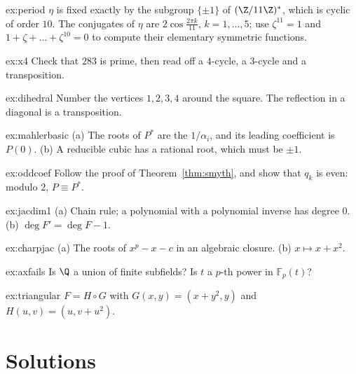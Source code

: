 \begin{hint}{ex:period}
$\eta$ is fixed exactly by the subgroup $\{\pm1\}$ of $(\Z/11\Z)^*$, which is cyclic of order $10$. The conjugates of $\eta$ are $2\cos\frac{2\pi k}{11}$,
$k=1,\dots,5$; use $\zeta^{11}=1$ and $1+\zeta+\dots+\zeta^{10}=0$ to compute their elementary symmetric functions.
\end{hint}
\begin{hint}{ex:x4}
Check that $283$ is prime, then read off a $4$-cycle, a $3$-cycle and a transposition.
\end{hint}
\begin{hint}{ex:dihedral}
Number the vertices $1,2,3,4$ around the square. The reflection in a diagonal is a transposition.
\end{hint}
\begin{hint}{ex:mahlerbasic}
(a) The roots of $P^*$ are the $1/\alpha_i$, and its leading coefficient is $P(0)$. (b) A reducible cubic has a rational root, which must be $\pm1$.
\end{hint}
\begin{hint}{ex:oddcoef}
Follow the proof of Theorem~\ref{thm:smyth}, and show that $q_k$ is even: modulo $2$, $P\equiv P^*$.
\end{hint}
\begin{hint}{ex:jacdim1}
(a) Chain rule; a polynomial with a polynomial inverse has degree $0$. (b) $\deg F'=\deg F-1$.
\end{hint}
\begin{hint}{ex:charpjac}
(a) The roots of $x^p-x-c$ in an algebraic closure. (b) $x\mapsto x+x^2$.
\end{hint}
\begin{hint}{ex:axfails}
Is $\Q$ a union of finite subfields? Is $t$ a $p$-th power in $\mathbb F_p(t)$?
\end{hint}
\begin{hint}{ex:triangular}
$F=H\circ G$ with $G(x,y)=(x+y^2,y)$ and $H(u,v)=(u,v+u^2)$.
\end{hint}

\section{Solutions}

